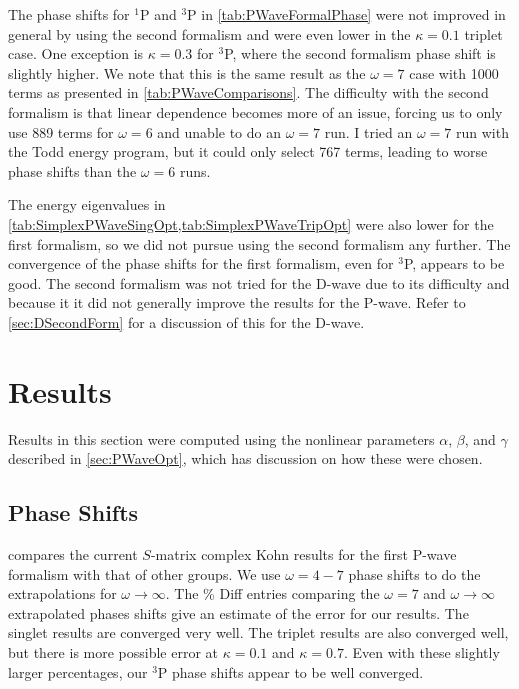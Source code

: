 \documentclass[Dissertation.tex]{subfiles}
\begin{document}
The phase shifts for $^1$P and $^3$P in \cref{tab:PWaveFormalPhase} were not 
improved in general by using the second formalism and were even lower in
the $\kappa = 0.1$ triplet case.
One exception is $\kappa = 0.3$ for $^3$P, where the second formalism phase shift
is slightly higher. We note that this is the same result as the $\omega = 7$
case with 1000 terms as presented in \cref{tab:PWaveComparisons}.
The difficulty with the second formalism is that linear dependence becomes more
of an issue, forcing us to only use 889 terms for $\omega = 6$ and unable to
do an $\omega = 7$ run. I tried an $\omega = 7$ run with the Todd energy
program, but it could only select 767 terms, leading to worse phase shifts than
the $\omega = 6$ runs.

The energy eigenvalues in \cref{tab:SimplexPWaveSingOpt,tab:SimplexPWaveTripOpt}
were also lower for the first formalism, so we did not pursue using the second
formalism any further. The convergence of the phase shifts for the first
formalism, even for $^3$P, appears to be good. The second formalism was not
tried for the D-wave due to its difficulty and because it it did not generally
improve the results for the P-wave. Refer to \cref{sec:DSecondForm} for a
discussion of this for the D-wave.


\section{Results}

Results in this section were computed using the nonlinear parameters $\alpha$,
$\beta$, and $\gamma$ described in \cref{sec:PWaveOpt}, which has discussion
on how these were chosen.

\subsection{Phase Shifts}

 compares the current $S$-matrix complex Kohn results for the 
first P-wave formalism with that of other groups. We use $\omega = 4 - 7$ 
phase shifts to do the extrapolations for $\omega \rightarrow \infty$. The
\% Diff entries comparing the $\omega = 7$ and $\omega \to \infty$ extrapolated
phases shifts give an estimate of the error for our results. The singlet 
results are converged very well. The triplet results are also converged well, 
but there is more possible error at $\kappa = 0.1$ and $\kappa = 0.7$. Even 
with these slightly larger percentages, our $^3$P phase shifts appear to be 
well converged.
\end{document}
